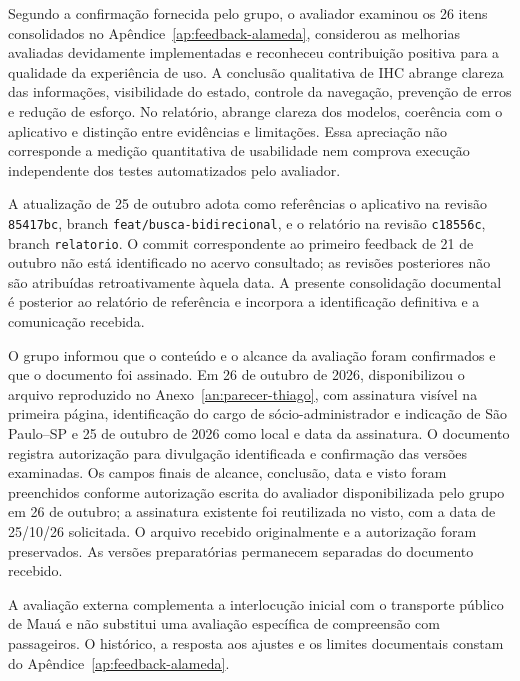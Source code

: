 \documentclass[12pt,oneside,a4paper,brazil,chapter=TITLE]{abntex2}
\begin{document}
Segundo a confirmação fornecida pelo grupo, o avaliador examinou os 26 itens consolidados no Apêndice~\ref{ap:feedback-alameda}, considerou as melhorias avaliadas devidamente implementadas e reconheceu contribuição positiva para a qualidade da experiência de uso. A conclusão qualitativa de IHC abrange clareza das informações, visibilidade do estado, controle da navegação, prevenção de erros e redução de esforço. No relatório, abrange clareza dos modelos, coerência com o aplicativo e distinção entre evidências e limitações. Essa apreciação não corresponde a medição quantitativa de usabilidade nem comprova execução independente dos testes automatizados pelo avaliador.

A atualização de 25 de outubro adota como referências o aplicativo na revisão \texttt{85417bc}, branch \texttt{feat/busca-bidirecional}, e o relatório na revisão \texttt{c18556c}, branch \texttt{relatorio}. O commit correspondente ao primeiro feedback de 21 de outubro não está identificado no acervo consultado; as revisões posteriores não são atribuídas retroativamente àquela data. A presente consolidação documental é posterior ao relatório de referência e incorpora a identificação definitiva e a comunicação recebida.

O grupo informou que o conteúdo e o alcance da avaliação foram confirmados e que o documento foi assinado. Em 26 de outubro de 2026, disponibilizou o arquivo reproduzido no Anexo~\ref{an:parecer-thiago}, com assinatura visível na primeira página, identificação do cargo de sócio-administrador e indicação de São Paulo--SP e 25 de outubro de 2026 como local e data da assinatura. O documento registra autorização para divulgação identificada e confirmação das versões examinadas. Os campos finais de alcance, conclusão, data e visto foram preenchidos conforme autorização escrita do avaliador disponibilizada pelo grupo em 26 de outubro; a assinatura existente foi reutilizada no visto, com a data de 25/10/26 solicitada. O arquivo recebido originalmente e a autorização foram preservados. As versões preparatórias permanecem separadas do documento recebido.

A avaliação externa complementa a interlocução inicial com o transporte público de Mauá e não substitui uma avaliação específica de compreensão com passageiros. O histórico, a resposta aos ajustes e os limites documentais constam do Apêndice~\ref{ap:feedback-alameda}.\par\endgroup
\end{document}
